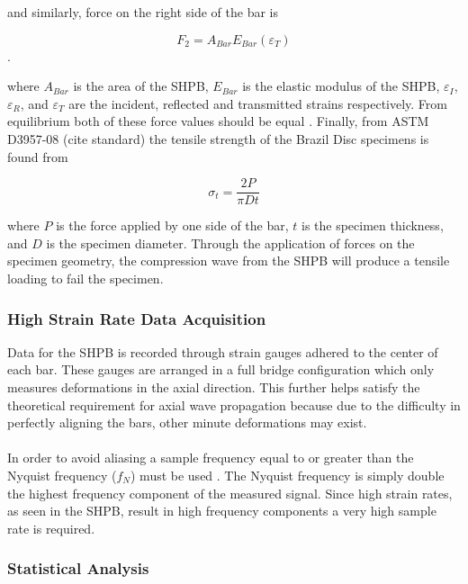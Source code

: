 \documentclass[12pt]{article}
\begin{document}
and similarly, force on the right side of the bar is

\begin{equation}
F_2 = A_{Bar}E_{Bar}(\varepsilon_T)
\end{equation}.

where $A_{Bar}$ is the area of the SHPB, $E_{Bar}$ is the elastic modulus of the SHPB, $\varepsilon_I$, $\varepsilon_R$, and $\varepsilon_T$ are the incident, reflected and transmitted strains respectively. From equilibrium both of these force values should be equal . Finally, from ASTM D3957-08 (cite standard) the tensile strength of the Brazil Disc specimens is found from

\begin{equation}
\sigma_t = \frac{2P}{\pi Dt}
\label{eq:stress}
\end{equation}

where $P$ is the force applied by one side of the bar, $t$ is the specimen thickness, and $D$ is the specimen diameter. Through the application of forces on the specimen geometry, the compression wave from the SHPB will produce a tensile loading to fail the specimen.

\subsubsection{High Strain Rate Data Acquisition} %
Data for the SHPB is recorded through strain gauges adhered to the center of each bar. These gauges are arranged in a full bridge configuration which only measures deformations in the axial direction. This further helps satisfy the theoretical requirement for axial wave propagation because due to the difficulty in perfectly aligning the bars, other minute deformations may exist.
\\ \\
In order to avoid aliasing a sample frequency equal to or greater than the Nyquist frequency ($f_N$) must be used \cite{Sampling}. The Nyquist frequency is simply double the highest frequency component of the measured signal. Since high strain rates, as seen in the SHPB, result in high frequency components a very high sample rate is required. 

\subsubsection{Statistical Analysis} %
\end{document}
